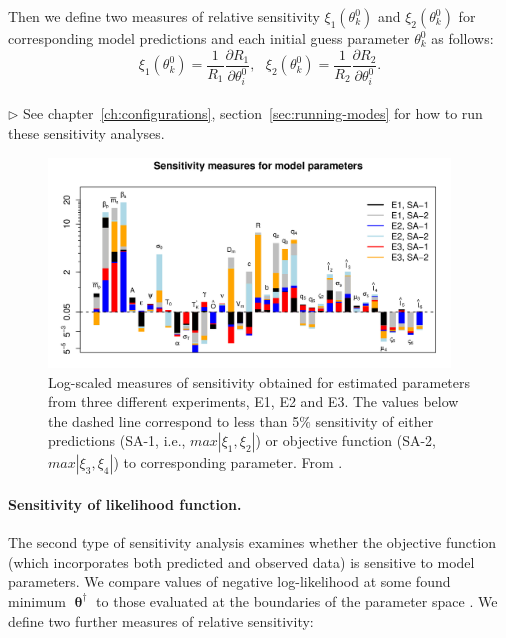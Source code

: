 Then we define two measures of relative sensitivity $\xi_1(\theta^0_k)$ and $\xi_2(\theta^0_k)$ for corresponding model predictions and each initial guess parameter $\theta^0_k$ as follows:
\begin{equation}
 \xi_1(\theta^0_k) =  \frac{1}{R_1} \frac{\partial{R_1}}{\partial{\theta^0_i}}, \text{ }
 \xi_2(\theta^0_k) =  \frac{1}{R_2} \frac{\partial{R_2}}{\partial{\theta^0_i}}.
\end{equation}
\\
$\triangleright$ See chapter~\ref{ch:configurations}, section~\ref{sec:running-modes} for how to run these sensitivity analyses. 

\begin{figure}[H]
	\centering
		\includegraphics[width=0.95\textwidth]{chapter4/figs/SA.png}
	\caption{Log-scaled measures of sensitivity obtained for estimated parameters from three different experiments, E1, E2 and E3. The values below the dashed line correspond to less than 5$\%$ sensitivity of either predictions (SA-1, i.e., $max{\left|\xi_1,\xi_2\right|}$) or objective function (SA-2, $max{\left|\xi_3,\xi_4\right|}$) to corresponding parameter. From \citet{Senina08}.}
	\label{fig:SA}
\end{figure}


\paragraph{Sensitivity of likelihood function.} The second type of sensitivity analysis examines whether the objective function (which incorporates both predicted and observed data) is sensitive to model parameters. We compare values of negative log-likelihood at some found minimum $\boldsymbol \uptheta^{\dag}$ to those evaluated at the boundaries of the parameter space \citep{Vallino}. We define two further measures of relative sensitivity:

